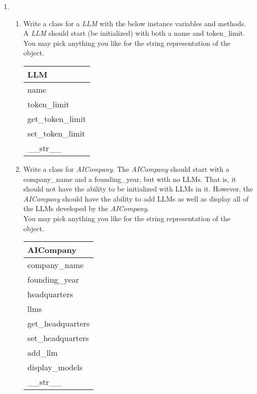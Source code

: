 \documentclass{article}
\begin{document}
\begin{enumerate}

	\item 
	\begin{enumerate}
		\item 
			Write a class for a \textit{LLM} with the below instance variables and methods.\\
			A \textit{LLM} should start (be initialized) with both a name and token\_limit.\\
			You may pick anything you like for the string representation of the object.
			\begin{flushright}
			\begin{tabular}{|l|} \hline
				LLM\\ \hline
				name\\ token\_limit\\ \hline
				get\_token\_limit \\ set\_token\_limit \\ \_\_str\_\_ \\ \hline
			\end{tabular}
			\end{flushright}
		
		\item 
			Write a class for \textit{AICompany}. The \textit{AICompany} should start
			with a company\_name and a founding\_year, but with no LLMs. That is, it should
			not have the ability to be initialized with LLMs in it. However, the
			\textit{AICompany} should have the ability to add LLMs as well as display all of the
			LLMs developed by the \textit{AICompany}.\\
			You may pick anything you like for the string representation of the object.
			\begin{flushright}
			\begin{tabular}{|l|} \hline 
				AICompany\\ \hline
				company\_name\\ founding\_year \\ headquarters \\ llms\\ \hline
				get\_headquarters\\ set\_headquarters\\ add\_llm\\ display\_models\\ 
					\_\_str\_\_ \\ \hline
			\end{tabular}
			\end{flushright}


\end{enumerate}
\end{enumerate}
\end{document}
